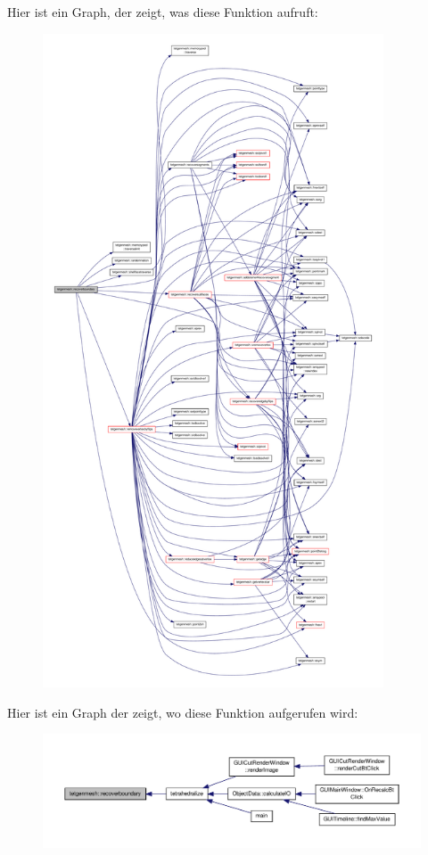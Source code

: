 Hier ist ein Graph, der zeigt, was diese Funktion aufruft\-:\nopagebreak
\begin{figure}[H]
\begin{center}
\leavevmode
\includegraphics[height=550pt]{classtetgenmesh_a1be7dce56688fbe7a97fc31f98b61c19_cgraph}
\end{center}
\end{figure}




Hier ist ein Graph der zeigt, wo diese Funktion aufgerufen wird\-:\nopagebreak
\begin{figure}[H]
\begin{center}
\leavevmode
\includegraphics[width=350pt]{classtetgenmesh_a1be7dce56688fbe7a97fc31f98b61c19_icgraph}
\end{center}
\end{figure}


